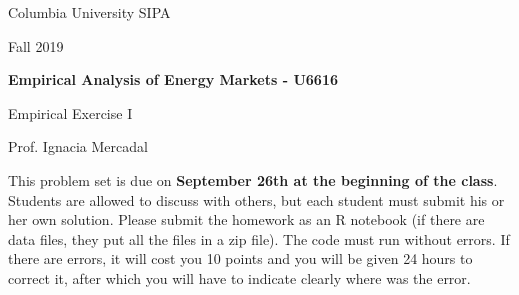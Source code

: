 \documentclass[12pt]{article}
\begin{document}
\begin{flushleft}
Columbia University SIPA	

Fall 2019

\end{flushleft}


\begin{center}
\textbf{Empirical Analysis of Energy Markets - U6616}

Empirical Exercise I

\end{center}

\begin{flushright}
Prof. Ignacia Mercadal	
\end{flushright}

This problem set is due on \textbf{September 26th at the beginning of the class}. Students are allowed to discuss with others, but each student must submit his or her own solution. Please submit the homework as an R notebook (if there are data files, they put all the files in a zip file). The code must run without errors. If there are errors, it will cost you 10 points and you will be given 24 hours to correct it, after which you will have to indicate clearly where was the error.
 
\end{document}
